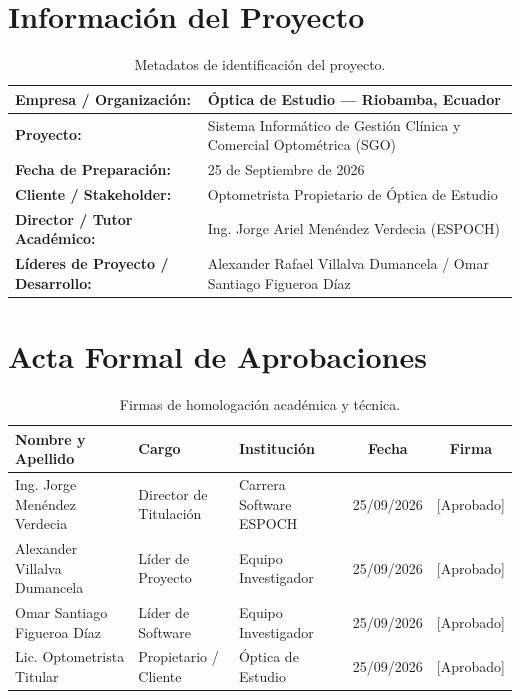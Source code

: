\documentclass[12pt,a4paper]{report}
\begin{document}
\vspace{0.8cm}
\section*{Información del Proyecto}
\begin{table}[H]
\centering
\small
\begin{tabularx}{\textwidth}{|L{5.5cm}|X|}
\hline
{}\textbf{Empresa / Organización:} & Óptica de Estudio --- Riobamba, Ecuador \\
\hline
\textbf{Proyecto:} & Sistema Informático de Gestión Clínica y Comercial Optométrica (SGO) \\
\hline
{}\textbf{Fecha de Preparación:} & 25 de Septiembre de 2026 \\
\hline
\textbf{Cliente / Stakeholder:} & Optometrista Propietario de Óptica de Estudio \\
\hline
{}\textbf{Director / Tutor Académico:} & Ing. Jorge Ariel Menéndez Verdecia (ESPOCH) \\
\hline
\textbf{Líderes de Proyecto / Desarrollo:} & Alexander Rafael Villalva Dumancela / Omar Santiago Figueroa Díaz \\
\hline
\end{tabularx}
\caption{Metadatos de identificación del proyecto.}
\end{table}

\vspace{0.8cm}
\section*{Acta Formal de Aprobaciones}
\begin{table}[H]
\centering
\small
\begin{tabularx}{\textwidth}{|L{4.2cm}|L{3.5cm}|L{3.2cm}|c|c|}
\hline
{}\color{white}\textbf{Nombre y Apellido} & \color{white}\textbf{Cargo} & \color{white}\textbf{Institución} & \color{white}\textbf{Fecha} & \color{white}\textbf{Firma} \\
\hline
Ing. Jorge Menéndez Verdecia & Director de Titulación & Carrera Software ESPOCH & 25/09/2026 & [Aprobado] \\
\hline
Alexander Villalva Dumancela & Líder de Proyecto & Equipo Investigador & 25/09/2026 & [Aprobado] \\
\hline
Omar Santiago Figueroa Díaz & Líder de Software & Equipo Investigador & 25/09/2026 & [Aprobado] \\
\hline
Lic. Optometrista Titular & Propietario / Cliente & Óptica de Estudio & 25/09/2026 & [Aprobado] \\
\hline
\end{tabularx}
\caption{Firmas de homologación académica y técnica.}
\end{table}
\end{document}
